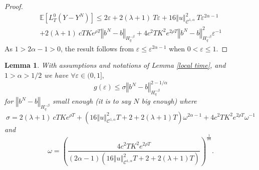 \documentclass[12pt]{article}
\newtheorem{lem}[theo]{Lemma}
\newcommand{\norme}[1]{\left\Vert #1\right\Vert}
\newcommand{\E}{\mathbb{E}}
\begin{document}
\begin{proof}
    \begin{multline*}
    \E\left[L^0_T(Y-Y^N)\right]\leq 2\varepsilon + 2(\lambda + 1)\ T\varepsilon
    +16\norme{u}_{\mathcal{C}^{1,\alpha}}^2\ T \varepsilon^{2\alpha-1}\\
    +2(\lambda + 1)\ cT Ke^{\rho T}\norme{b^N-b}_{H^{-\beta}_{q}} +4c^2T K^2e^{2\rho T}\norme{b^N-b}_{H^{-\beta}_{q}}^2\varepsilon^{-1}
    \end{multline*}    
    As $1>2\alpha-1>0$, the result follows from $\varepsilon\leq\varepsilon^{2\alpha-1}$ when $0<\varepsilon\leq1$.  
    
\end{proof}

\begin{lem}\label{key lemma}
    With assumptions and notations of Lemma \ref{local time}, and $1>\alpha>1/2$ we have $\forall \varepsilon\in(0,1],$
    \begin{equation}
    g(\varepsilon) \leq \sigma\norme{b^N-b}_{H^{-\beta}_{q}}^{2-1/\alpha}
    \end{equation}
    for $\norme{b^N-b}_{H^{-\beta}_{q}}$ small enough (it is to say $N$ big enough) where \begin{equation*}
    \sigma = 2(\lambda + 1)\ cT Ke^{\rho T} + \left(16\norme{u}_{\mathcal{C}^{1,\alpha}}^2 T + 2 + 2(\lambda + 1)T\right) \omega^{2\alpha-1} + 4c^2T K^2e^{2\rho T}\omega^{-1}
    \end{equation*} and \begin{equation*}
    \omega = \left(\frac{4c^2T K^2e^{2\rho T}}{(2\alpha-1)\left(16\norme{u}_{\mathcal{C}^{1,\alpha}}^2 T + 2 + 2(\lambda + 1)T\right)}\right)^{\frac{1}{2\alpha}}.
    \end{equation*}
\end{lem}
\end{document}
